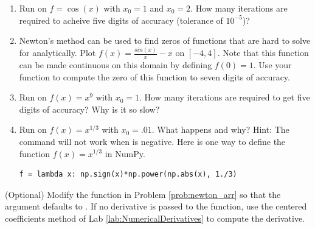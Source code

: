 \begin{problem}
\begin{enumerate}

\item Run  on $f=\cos(x)$ with $x_0=1$ and $x_0=2$. 
How many iterations are required to acheive five digits of accuracy (tolerance of $10^{-5}$)?
\item Newton's method can be used to find zeros of functions that are hard to solve for analytically.
Plot $f(x) = \frac{sin(x)}{x}-x$ on $[-4, 4]$. 
Note that this function can be made continuous on this domain by defining $f(0)=1$. 
Use your function  to compute the zero of this function to seven digits of accuracy.
\item Run  on $f(x)=x^9$ with $x_0=1$.  
How many iterations are required to get five digits of accuracy?  Why is it so slow?
\item Run  on $f(x)=x^{1/3}$ with $x_0=.01$. 
What happens and why?
Hint: The command  will not work when  is negative. 
Here is one way to define the function $f(x)=x^{1/3}$ in NumPy.
\begin{lstlisting}
f = lambda x: np.sign(x)*np.power(np.abs(x), 1./3)
\end{lstlisting}
\end{enumerate}
\end{problem}

\begin{problem}(Optional)
Modify the function  in Problem \ref{prob:newton_arr} so that the argument  defaults to .
If no derivative is passed to the function, use the centered coefficients method of Lab \ref{lab:NumericalDerivatives} to compute the derivative.
\end{problem}

